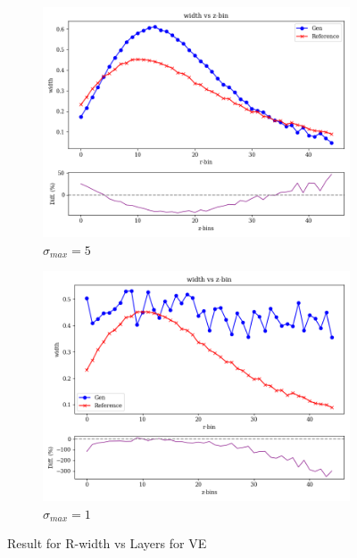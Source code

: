\begin{figure}[bthp]
\begin{subfigure}[b]{0.23\textwidth}
        \centering
        \includegraphics[width=\textwidth]{Figures/ve5_4.png}
        \caption{$\sigma_{max}=5$}
        \label{fig:ve5_4}
    \end{subfigure}
    \hfill
    \begin{subfigure}[b]{0.23\textwidth}  %
        \centering
        \includegraphics[width=\textwidth]{Figures/ve1_4.png}
        \caption{$\sigma_{max}=1$}
        \label{fig:ve1_4}
    \end{subfigure}
    \caption{Result for R-width vs Layers for VE}
\end{figure}

